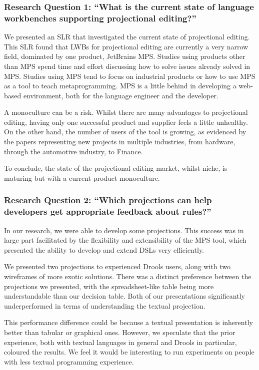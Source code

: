 \subsubsection{Research Question 1: ``What is the current state of language workbenches supporting projectional editing?''}
We presented an SLR that investigated the current state of projectional editing.
This SLR found that LWBs for projectional editing are currently a very narrow field, dominated by one product, JetBrains MPS.
Studies using products other than MPS spend time and effort discussing how to solve issues already solved in MPS.
Studies using MPS tend to focus on industrial products or how to use MPS as a tool to teach metaprogramming.
MPS is a little behind in developing a web-based environment, both for the language engineer and the developer.

A monoculture can be a risk.
Whilst there are many advantages to projectional editing, having only one successful product and supplier feels a little unhealthy.
On the other hand, the number of users of the tool is growing, as evidenced by the papers representing new projects in multiple industries, from hardware, through the automotive industry, to Finance.

To conclude, the state of the projectional editing market, whilst niche, is maturing but with a current product monoculture.

\subsubsection{Research Question 2: ``Which projections can help developers get appropriate feedback about rules?''}

In our research, we were able to develop some projections.  
This success was in large part facilitated by the flexibility and extensibility of the MPS tool, which presented the ability to develop and extend DSLs very efficiently.

We presented two projections to experienced Drools users, along with two wireframes of more exotic solutions.
There was a distinct preference between the projections we presented, with the spreadsheet-like table being more understandable than our decision table.
Both of our presentations significantly underperformed in terms of understanding the textual projection.

This performance difference could be because a textual presentation is inherently better than tabular or graphical ones.
However, we speculate that the prior experience, both with textual languages in general and Drools in particular, coloured the results.
We feel it would be interesting to run experiments on people with less textual programming experience.

